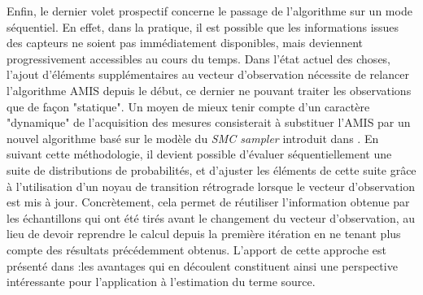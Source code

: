 Enfin, le dernier volet prospectif concerne le passage de l'algorithme sur un mode séquentiel. En effet, dans la pratique, il est possible que les informations issues des capteurs ne soient pas immédiatement disponibles, mais deviennent progressivement accessibles au cours du temps. Dans l'état actuel des choses, l'ajout d'éléments supplémentaires au vecteur d'observation nécessite de relancer l'algorithme AMIS depuis le début, ce dernier ne pouvant traiter les observations que de façon "statique". Un moyen de mieux tenir compte d'un caractère "dynamique" de l'acquisition des mesures consisterait à substituer l'AMIS par un nouvel algorithme basé sur le modèle du \textit{SMC sampler} introduit dans \cite{Delmoral2006}. En suivant cette méthodologie, il devient possible d'évaluer séquentiellement une suite de distributions de probabilités, et d'ajuster les éléments de cette suite grâce à l'utilisation d'un noyau de transition rétrograde lorsque le vecteur d'observation est mis à jour. Concrètement, cela permet de réutiliser l'information obtenue par les échantillons qui ont été tirés avant le changement du vecteur d'observation, au lieu de devoir reprendre le calcul depuis la première itération en ne tenant plus compte des résultats précédemment obtenus. L'apport de cette approche est présenté dans \cite{Nguyen2016}:les avantages qui en découlent constituent ainsi une perspective intéressante pour l'application à l'estimation du terme source.


